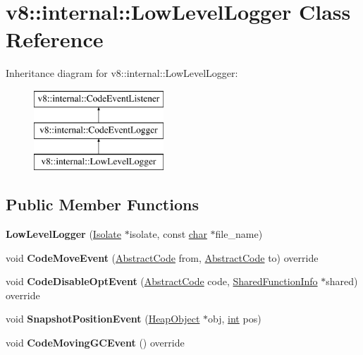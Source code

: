\hypertarget{classv8_1_1internal_1_1LowLevelLogger}{}\section{v8\+:\+:internal\+:\+:Low\+Level\+Logger Class Reference}
\label{classv8_1_1internal_1_1LowLevelLogger}
Inheritance diagram for v8\+:\+:internal\+:\+:Low\+Level\+Logger\+:\begin{figure}[H]
\begin{center}
\leavevmode
\includegraphics[height=3.000000cm]{classv8_1_1internal_1_1LowLevelLogger}
\end{center}
\end{figure}
\subsection*{Public Member Functions}
\begin{DoxyCompactItemize}
\item 
\mbox{\label{classv8_1_1internal_1_1LowLevelLogger_a1eb388535ad9c2a1d1605f756e0ddf5c}} 
{\bfseries Low\+Level\+Logger} (\mbox{\hyperlink{classv8_1_1internal_1_1Isolate}{Isolate}} $\ast$isolate, const \mbox{\hyperlink{classchar}{char}} $\ast$file\+\_\+name)
\item 
\mbox{\label{classv8_1_1internal_1_1LowLevelLogger_ae08ce3f3c1cee249e1dd1795ada25806}} 
void {\bfseries Code\+Move\+Event} (\mbox{\hyperlink{classv8_1_1internal_1_1AbstractCode}{Abstract\+Code}} from, \mbox{\hyperlink{classv8_1_1internal_1_1AbstractCode}{Abstract\+Code}} to) override
\item 
\mbox{\label{classv8_1_1internal_1_1LowLevelLogger_ab2260e931e521c9926d9277f9236b253}} 
void {\bfseries Code\+Disable\+Opt\+Event} (\mbox{\hyperlink{classv8_1_1internal_1_1AbstractCode}{Abstract\+Code}} code, \mbox{\hyperlink{classv8_1_1internal_1_1SharedFunctionInfo}{Shared\+Function\+Info}} $\ast$shared) override
\item 
\mbox{\label{classv8_1_1internal_1_1LowLevelLogger_a006542f9b1b0d8c1e93635fc8d3da4e8}} 
void {\bfseries Snapshot\+Position\+Event} (\mbox{\hyperlink{classv8_1_1internal_1_1HeapObject}{Heap\+Object}} $\ast$obj, \mbox{\hyperlink{classint}{int}} pos)
\item 
\mbox{\label{classv8_1_1internal_1_1LowLevelLogger_a202a99cfd523bc4d614322e538a92f89}} 
void {\bfseries Code\+Moving\+G\+C\+Event} () override
\end{DoxyCompactItemize}
